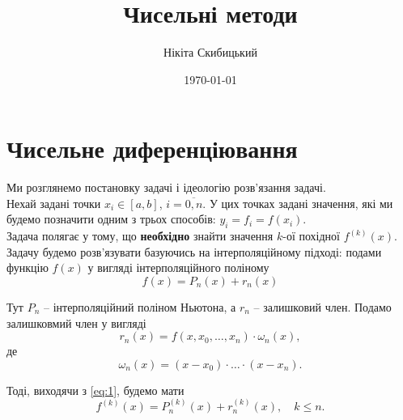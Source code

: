 


\title{Чисельні методи}
\author{Нікіта Скибицький}
\date{\today}



\maketitle

\tableofcontents

\section{Чисельне диференціювання}

Ми розглянемо постановку задачі і ідеологію розв'язання задачі. \\

Нехай задані точки $x_i \in [a, b]$, $i = \overline{0, n}$. У цих точках задані значення, які ми будемо позначити одним з трьох способів: $y_i = f_i = f(x_i)$.\\

Задача полягає у тому, що \textbf{необхідно} знайти значення $k$-ої похідної $f^{(k)}(x)$. \\

Задачу будемо розв'язувати базуючись на інтерполяційному підході: подами функцію $f(x)$ у вигляді інтерполяційного поліному
\begin{equation}
	\label{eq:1}
	f(x) = P_n(x) + r_n(x)
\end{equation}

Тут $P_n$ -- інтерполяційний поліном Ньютона, а $r_n$ -- залишковий член. Подамо залишковмий член у вигляді
\begin{equation}
	\label{eq:2}
	r_n(x) = f(x, x_0, \ldots, x_n) \cdot \omega_n(x),
\end{equation}
де
\begin{equation}
	\label{eq:3}
	\omega_n(x) = (x - x_0) \cdot \ldots \cdot (x - x_n).
\end{equation}

Тоді, виходячи з \eqref{eq:1}, будемо мати
\begin{equation}
	\label{eq:4}
	f^{(k)}(x) = P_n^{(k)}(x) + r_n^{(k)}(x), \quad k \le n.
\end{equation}

